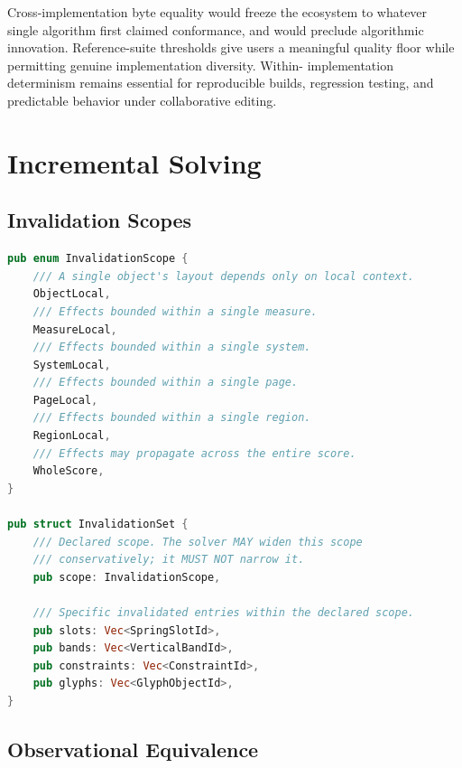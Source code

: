 \documentclass[11pt,letterpaper]{report}
\begin{document}
\begin{rationale}
  Cross-implementation byte equality would freeze the ecosystem
  to whatever single algorithm first claimed conformance, and
  would preclude algorithmic innovation. Reference-suite
  thresholds give users a meaningful quality floor while
  permitting genuine implementation diversity. Within-
  implementation determinism remains essential for reproducible
  builds, regression testing, and predictable behavior under
  collaborative editing.
\end{rationale}

\section{Incremental Solving}
\label{sec:solver:incremental}

\subsection{Invalidation Scopes}

\begin{lstlisting}[language=Rust]
pub enum InvalidationScope {
    /// A single object's layout depends only on local context.
    ObjectLocal,
    /// Effects bounded within a single measure.
    MeasureLocal,
    /// Effects bounded within a single system.
    SystemLocal,
    /// Effects bounded within a single page.
    PageLocal,
    /// Effects bounded within a single region.
    RegionLocal,
    /// Effects may propagate across the entire score.
    WholeScore,
}

pub struct InvalidationSet {
    /// Declared scope. The solver MAY widen this scope
    /// conservatively; it MUST NOT narrow it.
    pub scope: InvalidationScope,

    /// Specific invalidated entries within the declared scope.
    pub slots: Vec<SpringSlotId>,
    pub bands: Vec<VerticalBandId>,
    pub constraints: Vec<ConstraintId>,
    pub glyphs: Vec<GlyphObjectId>,
}
\end{lstlisting}

\subsection{Observational Equivalence}
\end{document}
